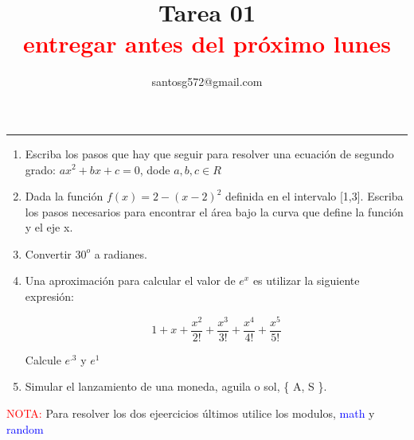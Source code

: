 \documentclass[a4paper]{article}
\title{Tarea 01 \\ \textcolor{red}{\small entregar antes del próximo lunes }}
\author{\small santosg572@gmail.com }
\begin{document}
\maketitle

\hrule

\begin{enumerate}
\item Escriba los pasos que hay que seguir para resolver una ecuación de segundo grado: $ax^2+bx+c=0$, dode $a,b, c 
\in R$
\item Dada la función $f(x) = 2 - (x-2)^2$ definida en el intervalo [1,3]. 
Escriba los pasos necesarios para encontrar el área bajo la curva que define la función y el eje x.
\item Convertir $30^o$ a radianes.
\item Una aproximación para calcular el valor de $e^x$ es utilizar la siguiente expresión:

\[
1 + x + \frac{x^2}{2!} + \frac{x^3}{3!} + \frac{x^4}{4!} + \frac{x^5}{5!}
\]   

Calcule $e^{.3}$ y $e^{1}$

\item Simular el lanzamiento de una moneda, aguila o sol, \{ A, S \}.

\end{enumerate}

 \textcolor{red}{\small NOTA: } Para resolver los dos ejeercicios últimos utilice los modulos, 
 \textcolor{blue}{math} y  \textcolor{blue}{random}
  
\end{document}
